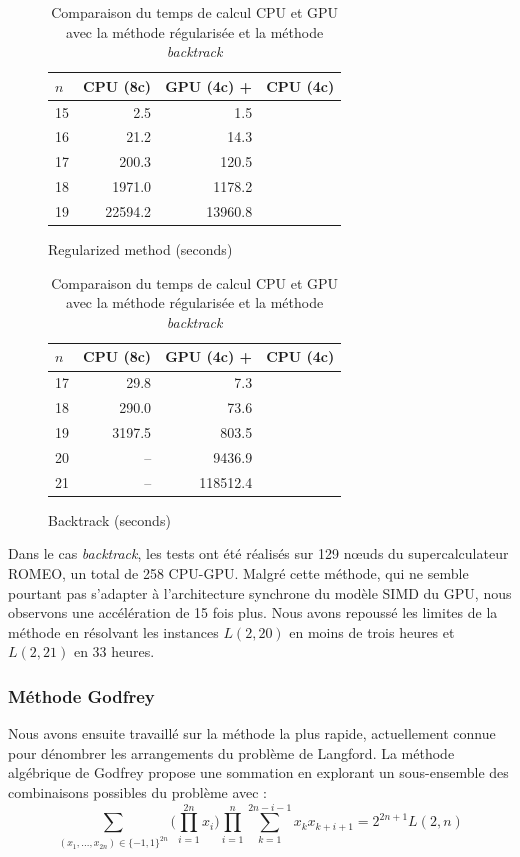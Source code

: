 \documentclass[12pt,a4paper]{report}
\begin{document}
\begin{table}[t!]
\begin{subfigure}[b]{0.5\linewidth}
\centering
\begin{tabular}{l r r r}
					\hline
					$n$ & CPU (8c) &  GPU (4c) +  &  \hspace*{-.8em}CPU (4c) \\
					\hline
					\hline
					15	& 2.5 & 1.5 & \\
					16  & 21.2 &14.3 & \\
					17  & 200.3 &120.5 &\\
					18  & 1971.0 &1178.2 &\\
					19  & 22594.2 & 13960.8 & \\ 
					\hline
\end{tabular}
\caption{Regularized method (seconds)}
\label{tab:result_base_regu}
\end{subfigure}
\begin{subfigure}[b]{0.5\linewidth}
\centering
\begin{tabular}{ l r r r }
					\hline
					$n$ & CPU (8c) &  GPU (4c) +  &  \hspace*{-.8em}CPU (4c) \\
					\hline
					\hline
					17  & 29.8 & 7.3&\\
					18  & 290.0 & 73.6&\\
					19  & 3197.5 & 803.5& \\
					20  & -- & 9436.9 &\\
					21  & -- & 118512.4& \\ 
					\hline
\end{tabular}	
\caption{Backtrack  (seconds)}
\label{tab:result_backtrack}
\end{subfigure}
\caption{Comparaison du temps de calcul CPU et GPU avec la méthode régularisée et la méthode \textit{backtrack}}
\end{table}

Dans le cas \textit{backtrack}, les tests ont été réalisés sur 129 nœuds du supercalculateur ROMEO, un total de 258 CPU-GPU. 
Malgré cette méthode, qui ne semble pourtant pas s'adapter à l'architecture synchrone du modèle SIMD du GPU, nous observons une accélération de 15 fois plus.
Nous avons repoussé les limites de la méthode en résolvant les instances $L(2,20)$ en moins de trois heures et $L(2,21)$ en 33 heures.

\subsubsection{Méthode Godfrey}
Nous avons ensuite travaillé sur la méthode la plus rapide, actuellement connue pour dénombrer les arrangements du problème de Langford. 
La méthode algébrique de Godfrey propose une sommation en explorant un sous-ensemble des combinaisons possibles du problème avec : 
\begin{equation}
\sum\limits_{(x_1,...,x_{2n}) \in \{-1,1\}^{2n}} \big( \prod\limits_{i=1}^{2n} x_i \big) \prod\limits_{i=1}^{n} \sum\limits_{k=1}^{2n-i-1} x_kx_{k+i+1} = 2^{2n+1} L(2,n)
\end{equation}
\end{document}
